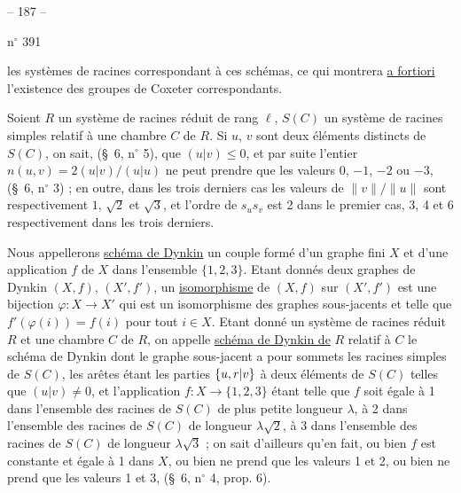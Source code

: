 \begin{center}-- 187 --\end{center}
\hfill n$^\circ$ 391

les systèmes de racines correspondant à ces schémas, ce qui montrera \uline{a fortiori}
l'existence des groupes de Coxeter correspondants.

Soient $R$ un système de racines réduit de rang $\ell$, $S(C)$ un système
de racines simples relatif à une chambre $C$ de $R$. Si $u$, $v$ sont deux éléments
distincts de $S(C)$, on sait, (\S\ 6, n$^\circ$ 5), que $(u|v)\leq0$,
et par suite l'entier $n(u,v)=2(u|v)/(u|u)$ ne peut prendre que les valeurs
$0$, $-1$, $-2$ ou $-3$, (\S\ 6, n$^\circ$ 3) ; en outre, dans les trois derniers
cas les valeurs de $\|v\|/\|u\|$ sont respectivement $1$, $\sqrt2$ et $\sqrt3$,
et l'ordre de $s_us_v$ est 2 dans le premier cas, 3, 4 et 6 respectivement
dans les trois derniers.

Nous appellerons \uline{schéma de Dynkin} un couple formé d'un graphe fini $X$
et d'une application $f$ de $X$ dans l'ensemble $\{1,2,3\}$.
Etant donnés deux graphes de Dynkin $(X,f)$, $(X',f')$, un \uline{isomorphisme}
de $(X,f)$ sur $(X',f')$ est une bijection $\varphi:X\longrightarrow X'$
qui est un isomorphisme des graphes sous-jacents et telle que
$f'(\varphi(i))=f(i)$ pour tout $i\in X$.
Etant donné un système de racines réduit $R$ et une chambre $C$ de $R$,
on appelle \uline{schéma de Dynkin de} $R$ relatif à $C$ le schéma de Dynkin dont
le graphe sous-jacent a pour sommets les racines simples de $S(C)$,
les arêtes étant les parties $\{u,{r|v}\}$ à deux éléments de $S(C)$
telles que $(u|v)\neq0$, et l'application $f:X\longrightarrow\{1,2,3\}$
étant telle que $f$ soit égale à 1 dans l'ensemble des racines de $S(C)$
de plus petite longueur $\lambda$, à 2 dans l'ensemble des racines de $S(C)$
de longueur $\lambda\sqrt2$, à 3 dans l'ensemble des racines de $S(C)$
de longueur $\lambda\sqrt3$ ; on sait d'ailleurs qu'en fait, ou bien $f$ est
constante et égale à 1 dans $X$, ou bien ne prend que les valeurs 1 et 2,
ou bien ne prend que les valeurs 1 et 3, (\S\ 6, n$^\circ$ 4, prop. 6).
